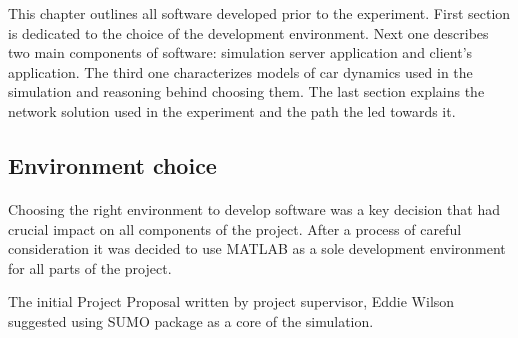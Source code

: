 \documentclass[11pt,english]{article}
\begin{document}
\par

This chapter outlines all software developed prior to the experiment. First section is dedicated to the choice of the development environment. Next one describes two main components of software: simulation server application and client's application. The third one characterizes models of car dynamics used in the simulation and reasoning behind choosing them. The last section explains the network solution used in the experiment and the path the led towards it.

\par




















\subsection{Environment choice}
\paragraph{}

Choosing the right environment to develop software was a key decision that had crucial impact on all components of the project. After a process of careful consideration it was decided to use MATLAB as a sole development environment for all parts of the project. 
\par
The initial Project Proposal written by project supervisor, Eddie Wilson suggested using SUMO package as a core of the simulation. 
\par
\end{document}

